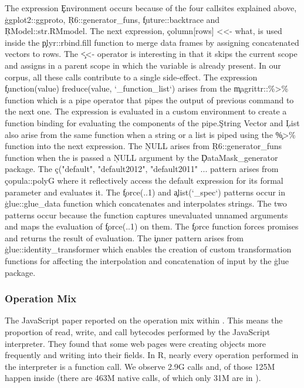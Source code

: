 \documentclass[USenglish,cleveref, autoref, thm-restate]{lipics-v2019}
\begin{document}
The expression \c{Environment} occurs because of the four callsites
explained above, \c{ggplot2::ggproto}, \c{R6::generator_funs},
\c{future::backtrace} and \c{RModel::str.RMmodel}. The next expression,
\c{column[rows] <<- what}, is used inside the \c{plyr::rbind.fill} function
to merge data frames by assigning concatenated vectors to rows. The \c{<<-}
operator is interesting in that it skips the current scope and assigns in a
parent scope in which the variable is already present. In our corpus, all
these \eval calls contribute to a single side-effect. The expression
\c{function(value) freduce(value, `_function_list`)} arises from the
\c{magrittr::\%>\%} function which is a pipe operator that pipes the output
of previous command to the next one. The expression is evaluated in a custom
environment to create a function binding for evaluating the components of
the pipe.\c{String Vector} and \c{List} also arise from the same function
when a string or a list is piped using the \c{\%>\%} function into the next
expression.  The \c{NULL} arises from \c{R6::generator_funs} function when
the \eval is passed a \c{NULL} argument by the \c{DataMask_generator}
package. The \c{c("default", "default2012", "default2011" ...} pattern
arises from \c{copula::polyG} where it reflectively access the default
expression for its formal parameter and evaluates it. The \c{force(..1)} and
\c{alist(`_spec`)} patterns occur in \c{glue::glue_data} function which
concatenates and interpolates strings. The two patterns occur because the
function captures unevaluated unnamed arguments and maps the evaluation of
\c{force(..1)} on them.  The \c{force} function forces promises and returns
the result of evaluation. The \c{inner} pattern arises from
\c{glue::identity_transformer} which enables the creation of custom
transformation functions for affecting the interpolation and concatenation
of input by the \c{glue} package.


\subsubsection{Operation Mix}

The JavaScript paper reported on the operation mix within \evals. This means
the proportion of read, write, and call bytecodes performed by the
JavaScript interpreter. They found that some web pages were creating objects
more frequently and writing into their fields.  In R, nearly every operation
performed in the interpreter is a function call. We observe 2.9G calls and,
of those 125M happen inside \eval (there are 463M native calls, of which
only 31M are in \eval).
\end{document}
